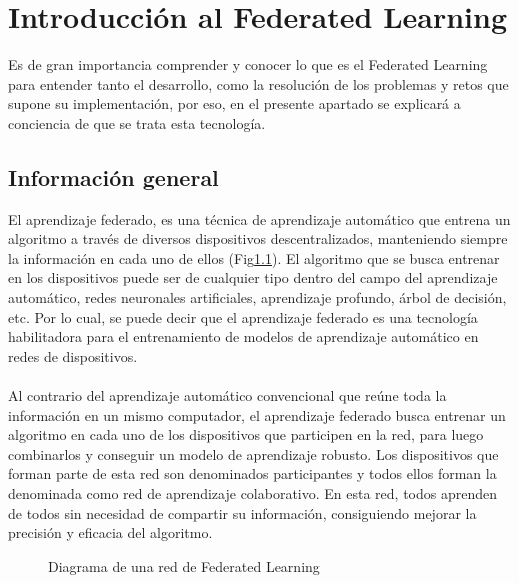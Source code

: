 \chapter{Introducción al Federated Learning}
\thispagestyle{fancy}
Es de gran importancia comprender y conocer lo que es el Federated Learning para entender tanto el desarrollo, como la resolución de los problemas y retos que supone su implementación, por eso, en el presente apartado se explicará a conciencia de que se trata esta tecnología. 

\section{Información general}
El aprendizaje federado, es una técnica de aprendizaje automático que entrena un algoritmo a través de diversos dispositivos descentralizados, manteniendo siempre la información en cada uno de ellos (Fig\ref{fig:FedLearArquitectura}). El algoritmo que se busca entrenar en los dispositivos puede ser de cualquier tipo dentro del campo del aprendizaje automático, redes neuronales artificiales, aprendizaje profundo, árbol de decisión, etc. Por lo cual, se puede decir que el aprendizaje federado es una tecnología habilitadora para el entrenamiento de modelos de aprendizaje automático en redes de dispositivos.
\\ \\
Al contrario del aprendizaje automático convencional que reúne toda la información en un mismo computador, el aprendizaje federado busca entrenar un algoritmo en cada uno de los dispositivos que participen en la red, para luego combinarlos y conseguir un modelo de aprendizaje robusto. Los dispositivos que forman parte de esta red son denominados participantes y todos ellos forman la denominada como red de aprendizaje colaborativo. En esta red, todos aprenden de todos sin necesidad de compartir su información, consiguiendo mejorar la precisión y eficacia del algoritmo. 
\begin{figure}[thbp]
    \centering
    \caption{Diagrama de una red de Federated Learning} 
    \label{fig:FedLearArquitectura}
\end{figure}
